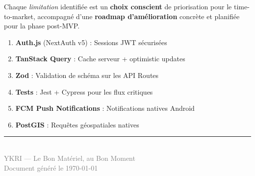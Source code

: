 \documentclass[12pt, a4paper]{article}
\begin{document}
Chaque \textit{limitation} identifiée est un \textbf{choix conscient} de priorisation pour le time-to-market, accompagné d'une \textbf{roadmap d'amélioration} concrète et planifiée pour la phase post-MVP.

\begin{infobox}
\begin{enumerate}
  \item \textbf{Auth.js} (NextAuth v5) : Sessions JWT sécurisées
  \item \textbf{TanStack Query} : Cache serveur + optimistic updates
  \item \textbf{Zod} : Validation de schéma sur les API Routes
  \item \textbf{Tests} : Jest + Cypress pour les flux critiques
  \item \textbf{FCM Push Notifications} : Notifications natives Android
  \item \textbf{PostGIS} : Requêtes géospatiales natives
\end{enumerate}
\end{infobox}

\vfill
\begin{center}
\textcolor{ykriGreen}{\rule{0.5\textwidth}{0.5pt}}\\[0.5em]
{\small\textcolor{gray}{YKRI — Le Bon Matériel, au Bon Moment}}\\
{\small\textcolor{gray}{Document généré le \today}}
\end{center}
\end{document}
